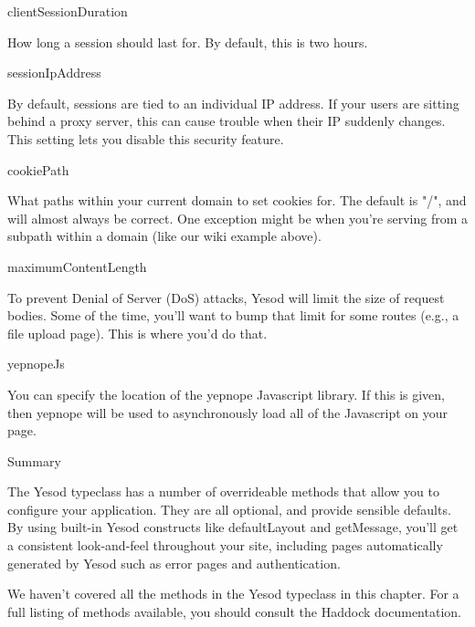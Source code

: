 clientSessionDuration

How long a session should last for. By default, this is two hours.

sessionIpAddress

By default, sessions are tied to an individual IP address. If your users are sitting behind a proxy server, this can cause trouble when their IP suddenly changes. This setting lets you disable this security feature.

cookiePath

What paths within your current domain to set cookies for. The default is "/", and will almost always be correct. One exception might be when you're serving from a subpath within a domain (like our wiki example above).

maximumContentLength

To prevent Denial of Server (DoS) attacks, Yesod will limit the size of request bodies. Some of the time, you'll want to bump that limit for some routes (e.g., a file upload page). This is where you'd do that.

yepnopeJs

You can specify the location of the yepnope Javascript library. If this is given, then yepnope will be used to asynchronously load all of the Javascript on your page.

Summary

The Yesod typeclass has a number of overrideable methods that allow you to configure your application. They are all optional, and provide sensible defaults. By using built-in Yesod constructs like defaultLayout and getMessage, you'll get a consistent look-and-feel throughout your site, including pages automatically generated by Yesod such as error pages and authentication.

We haven't covered all the methods in the Yesod typeclass in this chapter. For a full listing of methods available, you should consult the Haddock documentation.
